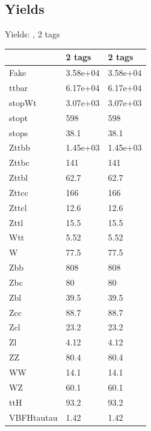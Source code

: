 
\subsection{Yields}

\begin{frame}{Yields: , 2 tags}
\begin{center}
  \begin{tabular}{l| >{\centering\let\newline\\\arraybackslash\hspace{0pt}}m{1.4cm}| >{\centering\let\newline\\\arraybackslash\hspace{0pt}}m{1.4cm}}
    & 2 tags & 2 tags \\
 \hline \hline
    Fake& 3.58e+04 & 3.58e+04 \\
 \hline
    ttbar& 6.17e+04 & 6.17e+04 \\
 \hline
    stopWt& 3.07e+03 & 3.07e+03 \\
 \hline
    stopt& 598 & 598 \\
 \hline
    stops& 38.1 & 38.1 \\
 \hline
    Zttbb& 1.45e+03 & 1.45e+03 \\
 \hline
    Zttbc& 141 & 141 \\
 \hline
    Zttbl& 62.7 & 62.7 \\
 \hline
    Zttcc& 166 & 166 \\
 \hline
    Zttcl& 12.6 & 12.6 \\
 \hline
    Zttl& 15.5 & 15.5 \\
 \hline
    Wtt& 5.52 & 5.52 \\
 \hline
    W& 77.5 & 77.5 \\
 \hline
    Zbb& 808 & 808 \\
 \hline
    Zbc& 80 & 80 \\
 \hline
    Zbl& 39.5 & 39.5 \\
 \hline
    Zcc& 88.7 & 88.7 \\
 \hline
    Zcl& 23.2 & 23.2 \\
 \hline
    Zl& 4.12 & 4.12 \\
 \hline
    ZZ& 80.4 & 80.4 \\
 \hline
    WW& 14.1 & 14.1 \\
 \hline
    WZ& 60.1 & 60.1 \\
 \hline
    ttH& 93.2 & 93.2 \\
 \hline
    VBFHtautau& 1.42 & 1.42 \\

\end{tabular}
\end{center}
\end{frame}
